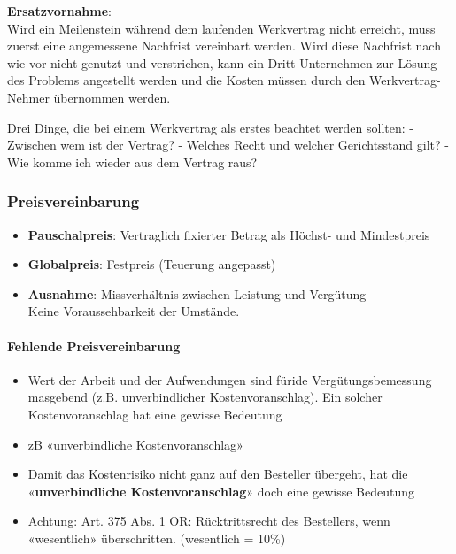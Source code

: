 \textbf{Ersatzvornahme}:\\
Wird ein Meilenstein während dem laufenden Werkvertrag nicht erreicht,
muss zuerst eine angemessene Nachfrist vereinbart werden. Wird diese
Nachfrist nach wie vor nicht genutzt und verstrichen, kann ein
Dritt-Unternehmen zur Lösung des Problems angestellt werden und die
Kosten müssen durch den Werkvertrag-Nehmer übernommen werden.

Drei Dinge, die bei einem Werkvertrag als erstes beachtet werden
sollten: - Zwischen wem ist der Vertrag? - Welches Recht und welcher
Gerichtsstand gilt? - Wie komme ich wieder aus dem Vertrag raus?

\hypertarget{preisvereinbarung}{%
\subsubsection{Preisvereinbarung}\label{preisvereinbarung}}

\begin{itemize}
\tightlist
\item
  \textbf{Pauschalpreis}: Vertraglich fixierter Betrag als Höchst- und
  Mindestpreis
\item
  \textbf{Globalpreis}: Festpreis (Teuerung angepasst)
\item
  \textbf{Ausnahme}: Missverhältnis zwischen Leistung und Vergütung\\
  Keine Voraussehbarkeit der Umstände.
\end{itemize}

\hypertarget{fehlende-preisvereinbarung}{%
\paragraph{Fehlende
Preisvereinbarung}\label{fehlende-preisvereinbarung}}

\begin{itemize}
\tightlist
\item
  Wert der Arbeit und der Aufwendungen sind füride Vergütungsbemessung
  masgebend (z.B. unverbindlicher Kostenvoranschlag). Ein solcher
  Kostenvoranschlag hat eine gewisse Bedeutung
\item
  zB «unverbindliche Kostenvoranschlag»
\item
  Damit das Kostenrisiko nicht ganz auf den Besteller übergeht, hat die
  «\textbf{unverbindliche Kostenvoranschlag}» doch eine gewisse
  Bedeutung
\item
  Achtung: Art. 375 Abs. 1 OR: Rücktrittsrecht des Bestellers, wenn
  «wesentlich» überschritten. (wesentlich = 10\%)
\end{itemize}

